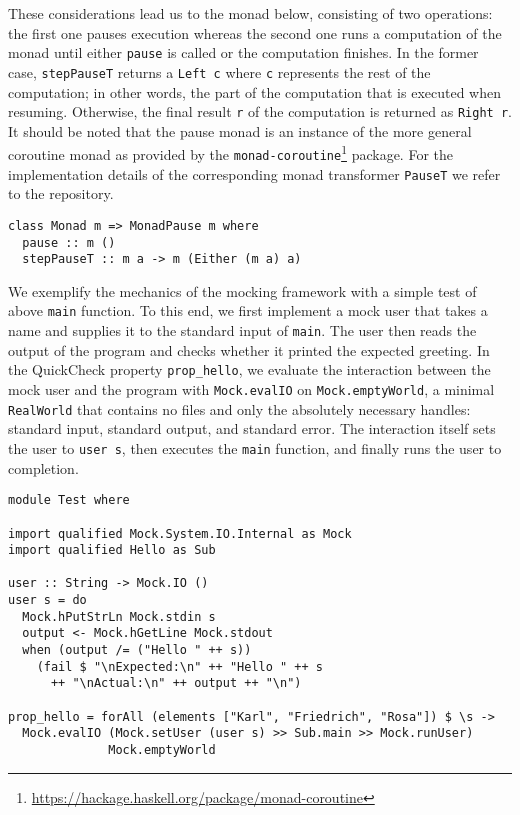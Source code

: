 These considerations lead us to the monad below,
consisting of two operations:
the first one pauses execution whereas the second one runs a computation of the monad until either \texttt{pause} is called or the computation finishes.
In the former case,
\texttt{stepPauseT} returns a \texttt{Left c} where \texttt{c} represents the rest of the computation; in other words, the part of the computation that is executed when resuming.
Otherwise, the final result \texttt{r} of the computation is returned as \texttt{Right r}.
It should be noted that the pause monad is an instance of the more general coroutine monad as provided by the \texttt{monad-coroutine}\footnote{\url{https://hackage.haskell.org/package/monad-coroutine}} package.
For the implementation details of the corresponding monad transformer \texttt{PauseT} we refer to the repository.
\begin{verbatim}
class Monad m => MonadPause m where
  pause :: m ()
  stepPauseT :: m a -> m (Either (m a) a)
\end{verbatim}
We exemplify the mechanics of the mocking framework with a simple test of above \texttt{main} function.
To this end, we first implement a mock user that takes a name and supplies it to the standard input of \texttt{main}.
The user then reads the output of the program and checks whether it printed the expected greeting.
In the QuickCheck property \texttt{prop_hello},
we evaluate the interaction between the mock user and the program with \texttt{Mock.evalIO} on \texttt{Mock.emptyWorld}, a minimal \texttt{RealWorld} that contains no files and only the absolutely necessary handles: standard input, standard output, and standard error.
The interaction itself sets the user to \texttt{user s},
then executes the \texttt{main} function, and finally runs the user to completion.
\begin{verbatim}
module Test where

import qualified Mock.System.IO.Internal as Mock
import qualified Hello as Sub

user :: String -> Mock.IO ()
user s = do
  Mock.hPutStrLn Mock.stdin s
  output <- Mock.hGetLine Mock.stdout
  when (output /= ("Hello " ++ s))
    (fail $ "\nExpected:\n" ++ "Hello " ++ s
      ++ "\nActual:\n" ++ output ++ "\n")

prop_hello = forAll (elements ["Karl", "Friedrich", "Rosa"]) $ \s ->
  Mock.evalIO (Mock.setUser (user s) >> Sub.main >> Mock.runUser)
              Mock.emptyWorld
\end{verbatim}
